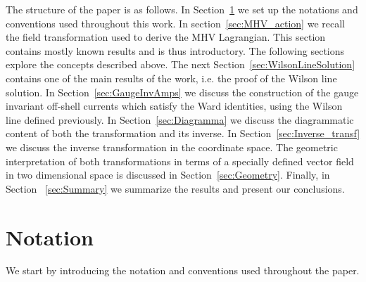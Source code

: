 \documentclass[english,american]{article}
\begin{document}
The structure of the paper is as follows.  In Section~\ref{sec:Notation} we set up the notations and conventions used throughout this work. In section~\ref{sec:MHV_action}  we recall the field transformation used to derive the MHV Lagrangian. This section contains mostly known results and is thus introductory. The following sections explore
the concepts described above. The next  Section~\ref{sec:WilsonLineSolution}
contains one of the main results of the work, i.e. the proof of the
Wilson line solution. In Section~\ref{sec:GaugeInvAmps} we discuss the construction of the gauge invariant off-shell currents which satisfy the Ward identities, using the Wilson line  defined previously. In Section~\ref{sec:Diagramma} we discuss the   diagrammatic content of both the transformation and its inverse. In Section~\ref{sec:Inverse_transf} we discuss the inverse transformation in the coordinate space. The geometric interpretation of both transformations in terms of a specially defined vector field in two dimensional space is discussed in Section~\ref{sec:Geometry}. Finally, in Section ~\ref{sec:Summary} we summarize the results and present our conclusions.

\section{Notation}

\label{sec:Notation}


We start by introducing the notation and conventions used throughout
the paper.
\end{document}
